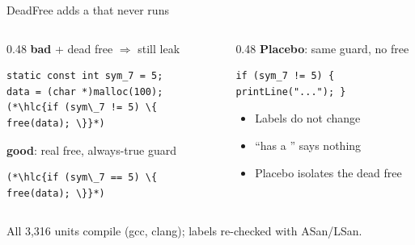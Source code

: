 \begin{frame}[fragile]{DeadFree adds a  that never runs}
  \begin{columns}[T]
    \begin{column}{0.48\textwidth}
      \textbf{bad} + dead free $\Rightarrow$ still \alert{leak}
\begin{lstlisting}[style=unit]
static const int sym_7 = 5;
data = (char *)malloc(100);
(*\hlc{if (sym\_7 != 5) \{ free(data); \}}*)
\end{lstlisting}
      \textbf{good}: real free, always-true guard
\begin{lstlisting}[style=unit]
(*\hlc{if (sym\_7 == 5) \{ free(data); \}}*)
\end{lstlisting}
    \end{column}
    \begin{column}{0.48\textwidth}
      \textbf{Placebo}: same guard, no free
\begin{lstlisting}[style=unit]
if (sym_7 != 5) { printLine("..."); }
\end{lstlisting}
      \vspace{4pt}
      \begin{itemize}
        \item Labels do not change
        \item ``has a '' says nothing
        \item Placebo isolates the dead free
      \end{itemize}
    \end{column}
  \end{columns}
  \vfill
  {\scriptsize All 3,316 units compile (gcc, clang); labels re-checked with ASan/LSan.\par}
\end{frame}


